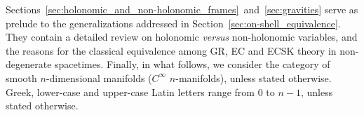 \documentclass[../../main.tex]{subfiles}
\begin{document}
Sections~\ref{sec:holonomic_and_non-holonomic_frames}~and~\ref{sec:gravities} serve as prelude to the generalizations addressed in Section~\ref{sec:on-shell_equivalence}. They contain a detailed review on holonomic \textit{versus} non-holonomic variables, and the reasons for the classical equivalence among GR, EC and ECSK theory in non-degenerate spacetimes. Finally, in what follows, we consider the category of smooth $n$-dimensional manifolds ($C^\infty$ $n$-manifolds), unless stated otherwise. Greek, lower-case and upper-case Latin letters range from $0$ to $n-1$, unless stated otherwise.
\end{document}
